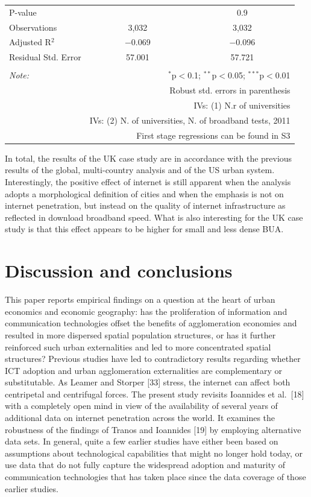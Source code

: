 \documentclass[10pt,letterpaper]{article}
\begin{document}
\begin{table}[!htbp]
\begin{tabular}{@{\extracolsep{5pt}}lcc}
P-value &  & 0.9 \\ 
Observations & 3,032 & 3,032 \\ 
Adjusted R$^{2}$ & $-$0.069 & $-$0.096 \\ 
Residual Std. Error & 57.001 & 57.721 \\ 
\hline 
\hline \\[-1.8ex] 
\textit{Note:}  & \multicolumn{2}{r}{$^{*}$p$<$0.1; $^{**}$p$<$0.05; $^{***}$p$<$0.01} \\ 
 & \multicolumn{2}{r}{Robust std. errors in parenthesis} \\ 
 & \multicolumn{2}{r}{IVs: (1) N.r of universities} \\ 
 & \multicolumn{2}{r}{IVs: (2) N. of universities, N. of broadband tests, 2011} \\ 
 & \multicolumn{2}{r}{First stage regressions can be found in S3} \\ 
\end{tabular} 
\end{table}

In total, the results of the UK case study are in accordance with the
previous results of the global, multi-country analysis and of the US
urban system. Interestingly, the positive effect of internet is still
apparent when the analysis adopts a morphological definition of cities
and when the emphasis is not on internet penetration, but instead on the
quality of internet infrastructure as reflected in download broadband
speed. What is also interesting for the UK case study is that this
effect appears to be higher for small and less dense BUA.

\hypertarget{sec6}{%
\section{Discussion and conclusions}\label{sec6}}

This paper reports empirical findings on a question at the heart of
urban economics and economic geography: has the proliferation of
information and communication technologies offset the benefits of
agglomeration economies and resulted in more dispersed spatial
population structures, or has it further reinforced such urban
externalities and led to more concentrated spatial structures? Previous
studies have led to contradictory results regarding whether ICT adoption
and urban agglomeration externalities are complementary or
substitutable. As Leamer and Storper {[}33{]} stress, the internet can
affect both centripetal and centrifugal forces. The present study
revisits Ioannides et al.~{[}18{]} with a completely open mind in view
of the availability of several years of additional data on internet
penetration across the world. It examines the robustness of the findings
of Tranos and Ioannides {[}19{]} by employing alternative data sets. In
general, quite a few earlier studies have either been based on
assumptions about technological capabilities that might no longer hold
today, or use data that do not fully capture the widespread adoption and
maturity of communication technologies that has taken place since the
data coverage of those earlier studies.
\end{document}
